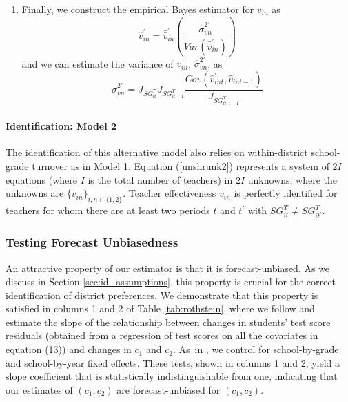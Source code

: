 \documentclass[notitlepage,12pt]{article}%
\begin{document}
\begin{enumerate}
\item Finally, we construct the empirical Bayes estimator for $v_{in}$ as
\[
\hat{v}_{in}^{\prime}=\bar{\bar{v}}_{in}^{\prime}\left(  \frac{\widehat{\sigma
}_{vn}^{2\prime}}{Var(\bar{\bar{v}}_{in}^{\prime})}\right)
\]
and we can estimate the variance of $v_{in}$, $\widehat{\sigma}_{vn}^{2\prime
}$, as
\[
\widehat{\sigma}_{vn}^{2\prime}=J_{SG_{it}^{T}}J_{SG_{it-1}^{T}}%
\frac{Cov(\widehat{v}_{int}^{\prime},\widehat{v}_{int-1}^{\prime}%
)}{J_{SG_{it,t-1}^{T}}}%
\]

\end{enumerate}

\paragraph{Identification: Model 2}

The identification of this alternative model also relies on within-district
school-grade turnover as in Model 1. Equation (\ref{unshrunk2}) represents a
system of $2I$ equations (where $I$ is the total number of teachers) in $2I$
unknowns, where the unknowns are $\{v_{in}\}_{i,n\in\{1,2\}}$. Teacher
effectiveness $v_{in}$ is perfectly identified for teachers for whom there are
at least two periods $t$ and $t^{\prime}$ with $SG_{it}^{T}\neq SG_{it^{\prime
}}^{T}$.



\subsubsection{Testing Forecast Unbiasedness}
\label{forecast}

An attractive property of our estimator is that it is forecast-unbiased. As we discuss in Section \ref{sec:id_assumptions}, this property is crucial for the correct identification of district preferences. We demonstrate that this property is satisfied in columns 1 and 2 of Table \ref{tab:rothstein}, where we follow
\citet{chetty2014measuring} and estimate the slope of the relationship between
changes in students' test score residuals (obtained from a regression of test
scores on all the covariates in equation (13)) and changes in $c_{1}$ and
$c_{2}$. As\ in \citet{chetty2014measuring}, we control for school-by-grade
and school-by-year fixed effects. These tests, shown in columns 1 and 2,
yield a slope coefficient that is statistically indistinguishable from one,
indicating that our estimates of $(c_{1},c_{2})$ are forecast-unbiased for
$(c_{1},c_{2})$.
\end{document}
